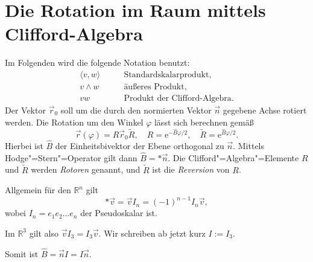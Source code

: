 \documentclass[a4paper,fleqn,11pt]{article}
\theoremstyle{rmbox}
\newcommand{\R}{\mathbb R}
\newcommand{\ee}{\mathrm e}
\begin{document}
\pagestyle{empty}

\section*{Die Rotation im Raum mittels Clifford-Algebra}

Im Folgenden wird die folgende Notation benutzt:
\begin{align*}
\langle v,w\rangle &\qquad \text{Standardskalarprodukt},\\
v\wedge w &\qquad \text{äußeres Produkt},\\
vw &\qquad \text{Produkt der Clifford-Algebra}.
\end{align*}
Der Vektor $\vec r_0$ soll um die durch den normierten Vektor $\vec n$
gegebene Achse rotiert werden. Die Rotation um den Winkel $\varphi$
lässt sich berechnen gemäß
\begin{equation}\label{eq:Rotation}
\vec r(\varphi) = R\vec r_0\tilde R,\quad R=\ee^{-\hat B\varphi/2},\quad\tilde R=\ee^{\hat B\varphi/2}.
\end{equation}
Hierbei ist $\hat B$ der Einheitsbivektor der Ebene orthogonal zu
$\vec n$. Mittels Hodge"=Stern"=Operator gilt dann $\hat B=*\vec n$.
Die Clifford"=Algebra"=Elemente $R$ und $\tilde R$
werden \emph{Rotoren} genannt, und $\tilde R$ ist die \emph{Reversion}
von $R$.

Allgemein für den $\R^n$ gilt
\begin{equation}\label{eq:Pseudoskalar-Vektor}
*\vec v = \vec vI_n = (-1)^{n-1}I_n\vec v,
\end{equation}
wobei $I_n = e_1e_2\ldots e_n$ der Pseudoskalar ist.

Im $\R^3$ gilt also $\vec vI_3=I_3\vec v$. Wir schreiben
ab jetzt kurz $I:=I_3$.

Somit ist $\hat B = \vec nI = I\vec n$.
\end{document}
